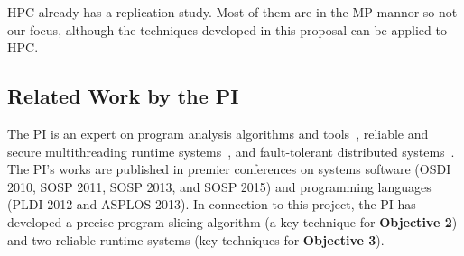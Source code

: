 
 HPC already has a replication study. Most of them are in the MP 
mannor so not our focus, although the techniques developed in this proposal can 
be applied to HPC.

\vspace{-.15in}\subsection{Related Work by the PI} 
\label{sec:my-work}\vspace{-.075in}
% 

The PI is an expert on program analysis algorithms and 
tools~\cite{wu:pldi12, woodpecker:asplos13, repframe:apsys15}, reliable and 
secure multithreading runtime systems~\cite{smt:cacm, cui:tern:osdi10, 
peregrine:sosp11, parrot:sosp13}, and fault-tolerant distributed 
systems~\cite{crane:sosp15}. The PI's works are published in 
premier conferences on systems software (OSDI 2010, SOSP 2011, SOSP 2013, and 
SOSP 2015) and programming languages (PLDI 2012 and ASPLOS 2013). In connection 
to this project, the PI has developed a precise program slicing algorithm (a 
key technique for \textbf{Objective 2}) and two reliable runtime systems (key 
techniques for \textbf{Objective 3}).


